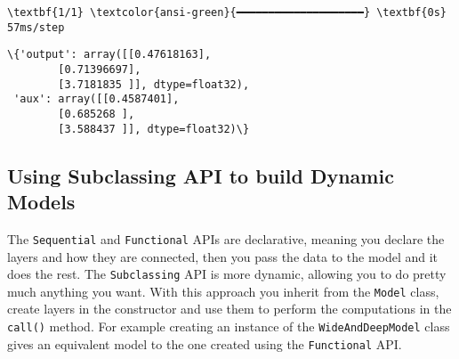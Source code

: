 \documentclass[12pt letter]{report}
\makeatletter
\newcommand{\boxspacing}{\kern\kvtcb@left@rule\kern\kvtcb@boxsep}
\newcommand{\prompt}[4]{
        {\ttfamily\llap{{\color{#2}[#3]:\hspace{3pt}#4}}\vspace{-\baselineskip}}
    }
\makeatother
\begin{document}
    \begin{Verbatim}[commandchars=\\\{\}]
\textbf{1/1} \textcolor{ansi-green}{━━━━━━━━━━━━━━━━━━━━} \textbf{0s} 57ms/step
    \end{Verbatim}

            \begin{tcolorbox}[breakable, size=fbox, boxrule=.5pt, pad at break*=1mm, opacityfill=0]
\prompt{Out}{outcolor}{38}{\boxspacing}
\begin{Verbatim}[commandchars=\\\{\}]
\{'output': array([[0.47618163],
        [0.71396697],
        [3.7181835 ]], dtype=float32),
 'aux': array([[0.4587401],
        [0.685268 ],
        [3.588437 ]], dtype=float32)\}
\end{Verbatim}
\end{tcolorbox}
        
\subsection{Using Subclassing API to build Dynamic
Models}\label{using-subclassing-api-to-build-dynamic-models}

The \texttt{Sequential} and \texttt{Functional} APIs are declarative,
meaning you declare the layers and how they are connected, then you pass
the data to the model and it does the rest. The \texttt{Subclassing} API
is more dynamic, allowing you to do pretty much anything you want. With
this approach you inherit from the \texttt{Model} class, create layers
in the constructor and use them to perform the computations in the
\texttt{call()} method. For example creating an instance of the
\texttt{WideAndDeepModel} class gives an equivalent model to the one
created using the \texttt{Functional} API.
\end{document}
